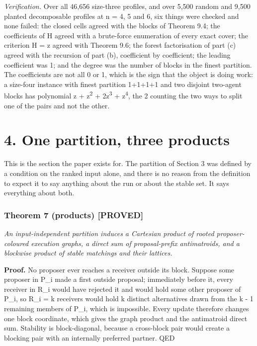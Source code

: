 \documentclass[
  11pt,
]{article}
\begin{document}
\emph{Verification.} Over all 46,656 size-three profiles, and over 5,500
random and 9,500 planted decomposable profiles at n = 4, 5 and 6, six
things were checked and none failed: the closed cells agreed with the
blocks of Theorem 9.4; the coefficients of H agreed with a brute-force
enumeration of every exact cover; the criterion H = z agreed with
Theorem 9.6; the forest factorisation of part (c) agreed with the
recursion of part (b), coefficient by coefficient; the leading
coefficient was 1; and the degree was the number of blocks in the finest
partition. The coefficients are not all 0 or 1, which is the sign that
the object is doing work: a size-four instance with finest partition
1+1+1+1 and two disjoint two-agent blocks has polynomial z +
z\textsuperscript{2} + 2z\textsuperscript{3} + z\textsuperscript{4}, the
2 counting the two ways to split one of the pairs and not the other.

\clearpage

\hypertarget{one-partition-three-products}{%
\section{4. One partition, three
products}\label{one-partition-three-products}}

This is the section the paper exists for. The partition of Section 3 was
defined by a condition on the ranked input alone, and there is no reason
from the definition to expect it to say anything about the run or about
the stable set. It says everything about both.

\hypertarget{theorem-7-products-proved}{%
\subsubsection{Theorem 7 (products)
{[}PROVED{]}}\label{theorem-7-products-proved}}

\emph{An input-independent partition induces a Cartesian product of
rooted proposer-coloured execution graphs, a direct sum of
proposal-prefix antimatroids, and a blockwise product of stable
matchings and their lattices.}

\textbf{Proof.} No proposer ever reaches a receiver outside its block.
Suppose some proposer in P\_i made a first outside proposal; immediately
before it, every receiver in R\_i would have rejected it and would hold
some other proposer of P\_i, so \textbar R\_i\textbar{} = k receivers
would hold k distinct alternatives drawn from the k - 1 remaining
members of P\_i, which is impossible. Every update therefore changes one
block coordinate, which gives the graph product and the antimatroid
direct sum. Stability is block-diagonal, because a cross-block pair
would create a blocking pair with an internally preferred partner. QED
\end{document}

